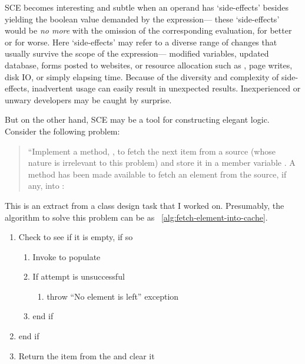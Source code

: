 SCE becomes interesting and subtle when an operand has `side-effects'
besides yielding the boolean value demanded by the expression---
these `side-effects' would be \emph{no more} with the omission of the corresponding evaluation,
for better or for worse.
Here `side-effects' may refer to a diverse range of changes
that usually survive the scope of the expression---
modified variables, updated database, forms posted to websites,
or resource allocation such as , page writes, disk IO, or simply elapsing time.
Because of the diversity and complexity of side-effects, inadvertent usage can easily result in
unexpected results.
Inexperienced or unwary developers may be caught by surprise.

But on the other hand, SCE may be a tool for constructing elegant logic.
Consider the following problem:
\begin{quote}
    ``Implement a method, , to fetch the next item from a source
    (whose nature is irrelevant to this problem) and store it in a member variable
    .
    A method  has been made available to fetch an element
    from the source, if any, into :
    
\end{quote}
This is an extract from a class design task that I worked on.
Presumably, the algorithm to solve this problem can be as ~\autoref{alg:fetch-element-into-cache}.
\begin{alisting}
    \caption{\label{alg:fetch-element-into-cache}}
    \begin{enumerate}
        \item Check  to see if it is empty, if so
        \begin{enumerate}
            \item Invoke  to populate 
            \item If attempt is unsuccessful
            \begin{enumerate}[label={}]
                \item throw ``No element is left'' exception
            \end{enumerate}
            \item end if
        \end{enumerate}
        \item end if
        \item Return the item from the  and clear it
    \end{enumerate}
\end{alisting}


